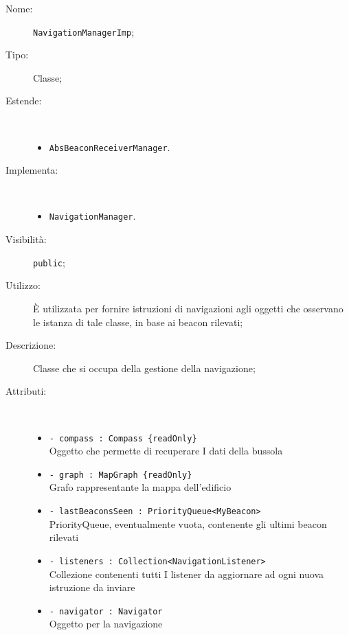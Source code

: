 \documentclass[../DefinizioneDiProdotto.tex]{subfiles}
\begin{document}
    \begin{description}
\item[Nome:] \texttt{NavigationManagerImp};
\item[Tipo:] Classe;
\item[Estende:] \
\begin{itemize}
\item \texttt{AbsBeaconReceiverManager}.
\end{itemize}
\item[Implementa:] \
\begin{itemize}
\item \texttt{NavigationManager}.

\end{itemize}
\item[Visibilità:] \texttt{public};
\item[Utilizzo:] È utilizzata per fornire istruzioni di navigazioni agli oggetti che osservano le istanza di tale classe, in base ai beacon rilevati;
\item[Descrizione:] Classe che si occupa della gestione della navigazione;
\item[Attributi:] \
\begin{itemize}
\item \texttt{- compass : Compass \{readOnly\}}\\
Oggetto che permette di recuperare I dati della bussola

\item \texttt{- graph : MapGraph \{readOnly\}}\\
Grafo rappresentante la mappa dell'edificio

\item \texttt{- lastBeaconsSeen : PriorityQueue<MyBeacon>}\\
PriorityQueue, eventualmente vuota, contenente gli ultimi beacon rilevati

\item \texttt{- listeners : Collection<NavigationListener>}\\
Collezione contenenti tutti I listener da aggiornare ad ogni nuova istruzione da inviare

\item \texttt{- navigator : Navigator}\\
Oggetto per la navigazione


\end{itemize}
\end{description}
\end{document}
